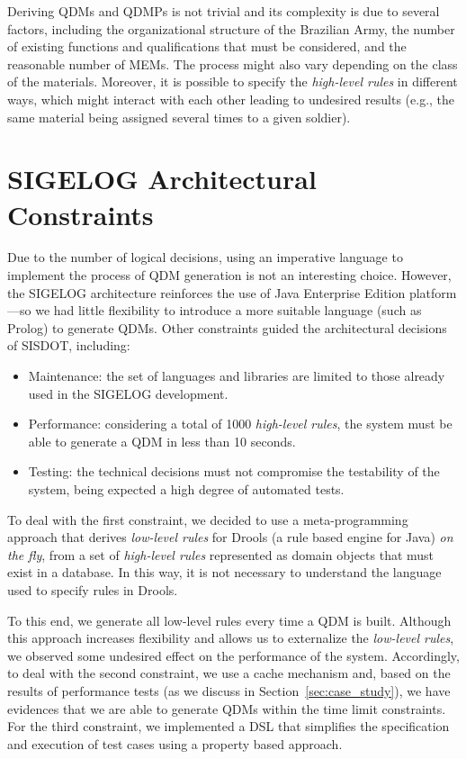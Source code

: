\documentclass[AMA,STIX1COL]{WileyNJD-v2}
\newcommand{\callers}{\emph{high-level rules}\xspace}
\begin{document}
Deriving QDMs and QDMPs is not trivial and its complexity is due to several factors, including the organizational structure of the Brazilian Army, the number of existing functions and qualifications that must be considered, and the reasonable number of MEMs. The process might also vary depending on the class of the materials. Moreover, it is possible to specify the \callers in different ways, which might interact with each other leading to undesired results (e.g., the same material being assigned several times to a given soldier). 

\section{SIGELOG Architectural Constraints}
\label{sigelog}

Due to the number of logical decisions, using an imperative language to implement the process of QDM generation 
is not an interesting choice. However, the SIGELOG architecture reinforces the use of Java Enterprise Edition platform---so we had little flexibility to introduce a more suitable language (such as Prolog) to generate QDMs. Other constraints guided the architectural decisions of SISDOT, including:  

\begin{itemize}
	\item Maintenance: the set of languages and libraries are limited to those already used in the SIGELOG development.  
	\item Performance: considering a total of 1000 \callers, the system must be able to generate a QDM in less than 10 seconds.
	\item Testing: the technical decisions must not compromise the testability of the system, being expected a high degree of automated tests. 
\end{itemize}

To deal with the first constraint, we decided to use a meta-programming approach that derives \emph{low-level rules} for Drools (a rule based engine for Java) \emph{on the fly}, from a set of \callers represented as domain objects that must exist in a database. In this way, it is not necessary to understand the language used to specify rules in Drools.

To this end, we generate all low-level rules every time a QDM is built.
Although this approach increases flexibility and allows us to externalize the \emph{low-level rules}, we observed some undesired effect on the performance of the system. Accordingly, to deal with the second constraint, we use a cache mechanism and, based on the results of performance tests (as we discuss in Section~\ref{sec:case_study}), we have evidences that we are able to generate QDMs within the time
limit constraints. For the third constraint, we implemented a DSL that simplifies the specification and execution of test cases using a property based approach. 
\end{document}
